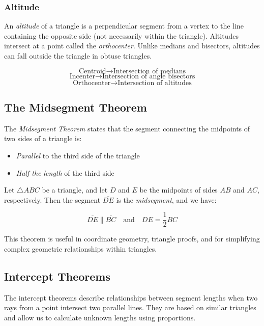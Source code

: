 \subsubsection*{Altitude}

An \emph{altitude} of a triangle is a perpendicular segment from a vertex to the line containing the 
opposite side (not necessarily within the triangle). Altitudes intersect at a point called the 
\emph{orthocenter}. Unlike medians and bisectors, altitudes can fall outside the triangle in obtuse 
triangles.

\[
	\text{Centroid} \rightarrow \text{Intersection of medians}\]
\[
	\text{Incenter} \rightarrow \text{Intersection of angle bisectors}\]
\[
	\text{Orthocenter} \rightarrow \text{Intersection of altitudes}
\]

\subsection{The Midsegment Theorem}

The \emph{Midsegment Theorem} states that the segment connecting the midpoints of two sides of a triangle 
is:

\begin{itemize}

	\item \emph{Parallel} to the third side of the triangle

	\item \emph{Half the length} of the third side

\end{itemize}

Let \( \triangle ABC \) be a triangle, and let \( D \) and \( E \) be the 
midpoints of sides \( AB \) and \( AC \), respectively. Then the segment \( \overline{DE} \) is 
the \emph{midsegment}, and we have:

\[
	\overline{DE} \parallel \overline{BC} \quad \text{and} \quad DE = \frac{1}{2} BC
\]

This theorem is useful in coordinate geometry, triangle proofs, 
and for simplifying complex geometric relationships within triangles.

\subsection{Intercept Theorems}

The intercept theorems describe relationships between segment lengths when two rays from a point intersect 
two parallel lines. They are based on similar triangles and allow us to calculate unknown lengths using 
proportions.

